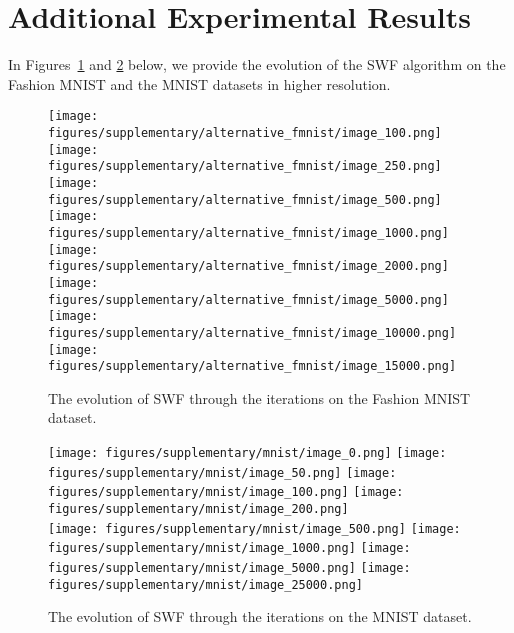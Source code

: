 


\section{Additional Experimental Results}

In Figures~\ref{fig:suppfmnist} and \ref{fig:suppmnist} below, we provide the evolution of the SWF algorithm on the Fashion MNIST and the MNIST datasets in higher resolution.

\begin{figure}
\centering
\texttt{[image: figures/supplementary/alternative\_fmnist/image\_100.png]}
\texttt{[image: figures/supplementary/alternative\_fmnist/image\_250.png]}
\texttt{[image: figures/supplementary/alternative\_fmnist/image\_500.png]}
\texttt{[image: figures/supplementary/alternative\_fmnist/image\_1000.png]}\\
\texttt{[image: figures/supplementary/alternative\_fmnist/image\_2000.png]}
\texttt{[image: figures/supplementary/alternative\_fmnist/image\_5000.png]}
\texttt{[image: figures/supplementary/alternative\_fmnist/image\_10000.png]}
\texttt{[image: figures/supplementary/alternative\_fmnist/image\_15000.png]}
\caption{The evolution of SWF through the iterations on the Fashion MNIST dataset.}
\label{fig:suppfmnist}
\end{figure}


\begin{figure}
\centering
\texttt{[image: figures/supplementary/mnist/image\_0.png]}
\texttt{[image: figures/supplementary/mnist/image\_50.png]}
\texttt{[image: figures/supplementary/mnist/image\_100.png]}
\texttt{[image: figures/supplementary/mnist/image\_200.png]}\\
\texttt{[image: figures/supplementary/mnist/image\_500.png]}
\texttt{[image: figures/supplementary/mnist/image\_1000.png]}
\texttt{[image: figures/supplementary/mnist/image\_5000.png]}
\texttt{[image: figures/supplementary/mnist/image\_25000.png]}
\caption{The evolution of SWF through the iterations on the MNIST dataset.}
\label{fig:suppmnist}
\end{figure}




